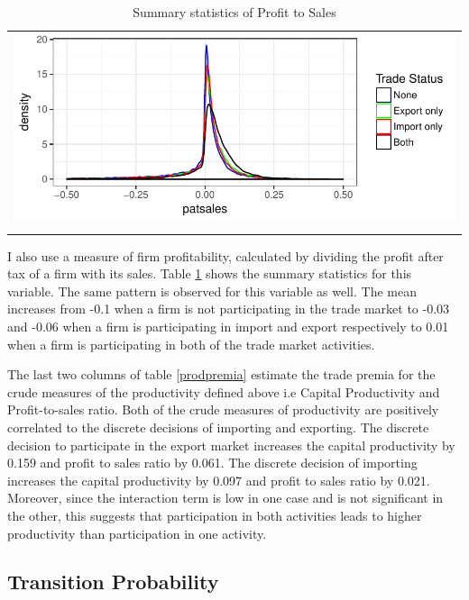 \documentclass[12pt]{article}
\begin{document}
\begin{center}
\begin{table}[H]
\caption{Summary statistics of Profit to Sales}
\label{tab:pts}
\begin{tabular}{c}
 \includegraphics{./PICS/denspatsales.pdf}   \\ 
   \\  
\end{tabular}
\end{table}
\end{center}

I also use a measure of firm profitability, calculated by dividing the profit
after tax of
a firm with its sales. Table \ref{tab:pts} shows the summary
statistics for this variable. The same pattern is observed for this variable as well. The mean increases from -0.1 when a firm is not participating in
the trade market to -0.03 and  -0.06 when a firm is participating in
import and export respectively to 0.01 when a firm is participating in
both of the trade market activities.  

The last two columns of table \ref{prodpremia} estimate the trade
premia for the crude measures of the productivity defined above i.e
Capital Productivity and Profit-to-sales ratio. Both
of the crude measures of productivity are positively correlated to the discrete
decisions of importing and exporting. The discrete decision to participate
in the export market increases the capital productivity by 0.159 and
profit to sales ratio by 0.061. The discrete decision of importing
increases the  capital productivity by 0.097 and
profit to sales ratio by 0.021. 
Moreover, since the interaction term is low in one case and 
is not significant in the other, this suggests that participation in both activities
leads to higher productivity than participation in one activity.
 
\subsection{Transition Probability}
\end{document}
